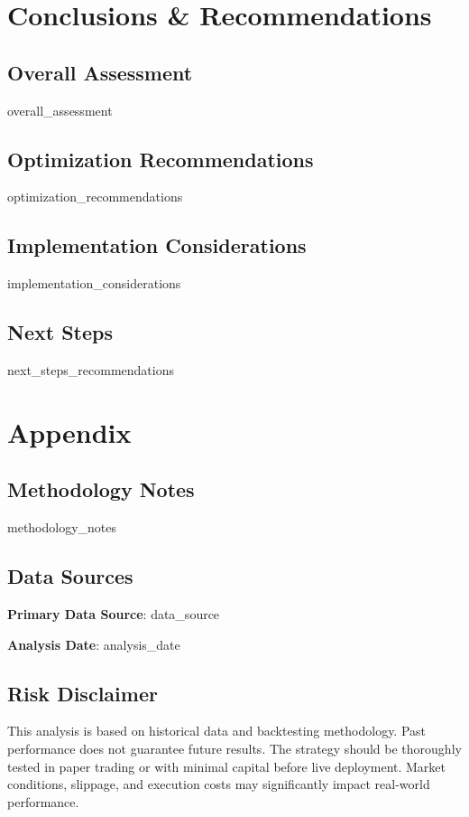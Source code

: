\documentclass[11pt,a4paper]{article}
\begin{document}
\section{Conclusions \& Recommendations}

\subsection{Overall Assessment}
{{overall_assessment}}

\subsection{Optimization Recommendations}
\begin{itemize}
{{optimization_recommendations}}
\end{itemize}

\subsection{Implementation Considerations}
{{implementation_considerations}}

\subsection{Next Steps}
{{next_steps_recommendations}}

\section{Appendix}

\subsection{Methodology Notes}
{{methodology_notes}}

\subsection{Data Sources}
\textbf{Primary Data Source}: {{data_source}}

\textbf{Analysis Date}: {{analysis_date}}

\subsection{Risk Disclaimer}
This analysis is based on historical data and backtesting methodology. Past performance does not guarantee future results. The strategy should be thoroughly tested in paper trading or with minimal capital before live deployment. Market conditions, slippage, and execution costs may significantly impact real-world performance.
\end{document}
